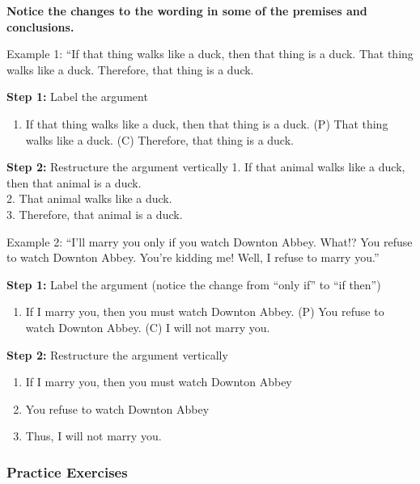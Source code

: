 \documentclass[
]{book}
\providecommand{\tightlist}{%
  \setlength{\itemsep}{0pt}\setlength{\parskip}{0pt}}
\begin{document}
\begin{caution}
\textbf{Notice the changes to the wording in some of the premises and conclusions.}
\end{caution}

Example 1:
``If that thing walks like a duck, then that thing is a duck. That thing walks like a duck. Therefore, that thing is a duck.

\textbf{Step 1:} Label the argument

\begin{enumerate}
\def\labelenumi{(\Alph{enumi})}
\setcounter{enumi}{15}
\tightlist
\item
  If that thing walks like a duck, then that thing is a duck. (P) That thing walks like a duck. (C) Therefore, that thing is a duck.
\end{enumerate}

\textbf{Step 2:} Restructure the argument vertically
1. If that animal walks like a duck, then that animal is a duck.\\
2. That animal walks like a duck.\\
3. Therefore, that animal is a duck.

Example 2:
``I'll marry you only if you watch Downton Abbey. What!? You refuse to watch Downton Abbey. You're kidding me! Well, I refuse to marry you.''

\textbf{Step 1:} Label the argument (notice the change from ``only if'' to ``if then'')

\begin{enumerate}
\def\labelenumi{(\Alph{enumi})}
\setcounter{enumi}{15}
\tightlist
\item
  If I marry you, then you must watch Downton Abbey. (P) You refuse to watch Downton Abbey. (C) I will not marry you.
\end{enumerate}

\textbf{Step 2:} Restructure the argument vertically

\begin{enumerate}
\def\labelenumi{\arabic{enumi}.}
\tightlist
\item
  If I marry you, then you must watch Downton Abbey\\
\item
  You refuse to watch Downton Abbey\\
\item
  Thus, I will not marry you.
\end{enumerate}

\hypertarget{practice-exercises-2}{%
\subsubsection*{Practice Exercises}\label{practice-exercises-2}}
\end{document}
